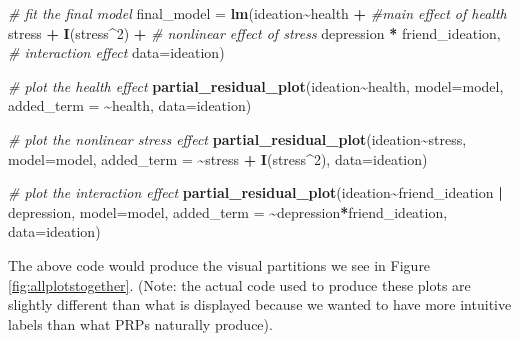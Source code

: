 \documentclass[
  man,floatsintext]{apa6}
\newenvironment{Shaded}{\begin{snugshade}}{\end{snugshade}}
\newcommand{\AttributeTok}[1]{\textcolor[rgb]{0.13,0.29,0.53}{#1}}
\newcommand{\CommentTok}[1]{\textcolor[rgb]{0.56,0.35,0.01}{\textit{#1}}}
\newcommand{\DecValTok}[1]{\textcolor[rgb]{0.00,0.00,0.81}{#1}}
\newcommand{\FunctionTok}[1]{\textcolor[rgb]{0.13,0.29,0.53}{\textbf{#1}}}
\newcommand{\NormalTok}[1]{#1}
\newcommand{\OtherTok}[1]{\textcolor[rgb]{0.56,0.35,0.01}{#1}}
\newcommand{\SpecialCharTok}[1]{\textcolor[rgb]{0.81,0.36,0.00}{\textbf{#1}}}
\begin{document}
\begin{Shaded}
\begin{Highlighting}[]
\CommentTok{\# fit the final model}
\NormalTok{final\_model }\OtherTok{=} \FunctionTok{lm}\NormalTok{(ideation}\SpecialCharTok{\textasciitilde{}}\NormalTok{health }\SpecialCharTok{+} \CommentTok{\#main effect of health}
\NormalTok{    stress }\SpecialCharTok{+} \FunctionTok{I}\NormalTok{(stress}\SpecialCharTok{\^{}}\DecValTok{2}\NormalTok{) }\SpecialCharTok{+} \CommentTok{\# nonlinear effect of stress}
\NormalTok{    depression }\SpecialCharTok{*}\NormalTok{ friend\_ideation, }\CommentTok{\# interaction effect}
    \AttributeTok{data=}\NormalTok{ideation)}

\CommentTok{\# plot the health effect}
\FunctionTok{partial\_residual\_plot}\NormalTok{(ideation}\SpecialCharTok{\textasciitilde{}}\NormalTok{health, }
              \AttributeTok{model=}\NormalTok{model, }
              \AttributeTok{added\_term =} \SpecialCharTok{\textasciitilde{}}\NormalTok{health, }
              \AttributeTok{data=}\NormalTok{ideation)}

\CommentTok{\# plot the nonlinear stress effect}
\FunctionTok{partial\_residual\_plot}\NormalTok{(ideation}\SpecialCharTok{\textasciitilde{}}\NormalTok{stress, }
              \AttributeTok{model=}\NormalTok{model, }
              \AttributeTok{added\_term =} \SpecialCharTok{\textasciitilde{}}\NormalTok{stress }\SpecialCharTok{+} \FunctionTok{I}\NormalTok{(stress}\SpecialCharTok{\^{}}\DecValTok{2}\NormalTok{), }
              \AttributeTok{data=}\NormalTok{ideation) }

\CommentTok{\# plot the interaction effect}
\FunctionTok{partial\_residual\_plot}\NormalTok{(ideation}\SpecialCharTok{\textasciitilde{}}\NormalTok{friend\_ideation }\SpecialCharTok{|}\NormalTok{ depression, }
                      \AttributeTok{model=}\NormalTok{model, }
                      \AttributeTok{added\_term =} \SpecialCharTok{\textasciitilde{}}\NormalTok{depression}\SpecialCharTok{*}\NormalTok{friend\_ideation, }
                      \AttributeTok{data=}\NormalTok{ideation) }
\end{Highlighting}
\end{Shaded}

The above code would produce the visual partitions we see in Figure \ref{fig:allplotstogether}. (Note: the actual code used to produce these plots are slightly different than what is displayed because we wanted to have more intuitive labels than what PRPs naturally produce).
\end{document}
